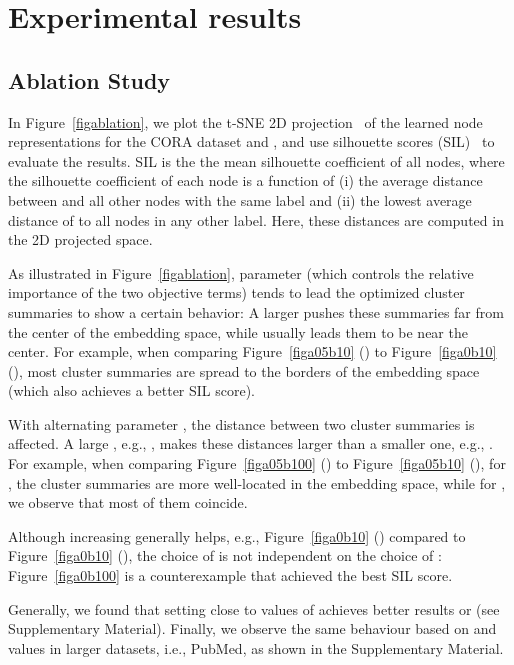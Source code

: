 \documentclass{article}
\begin{document}
\section{Experimental results}

\subsection{Ablation Study} \label{secintra}
In Figure~\ref{figablation}, we plot the t-SNE 2D projection~\cite{maaten2008visualizing} of the learned node representations for the CORA dataset and , and use silhouette scores (SIL)~\cite{rousseeuw1987silhouettes} to evaluate the results. SIL is the the mean silhouette coefficient of all nodes, where the silhouette coefficient of each node  is a function of (i) the average distance between  and all other nodes with the same label and (ii) the lowest average distance of  to all nodes in any other label. Here, these distances are computed in the 2D projected space.

As illustrated in Figure~\ref{figablation}, parameter  (which controls the relative importance of the two objective terms) tends to lead the optimized cluster summaries to show a certain behavior: A larger  pushes these summaries far from the center of the embedding space, while  usually leads them to be near the center. For example, when comparing Figure~\ref{figa05b10} () to Figure~\ref{figa0b10} (), most cluster summaries are spread to the borders of the embedding space (which also achieves a better SIL score).

With alternating parameter , the distance between two cluster summaries is affected.  A large , e.g., , makes these distances larger than a smaller one, e.g., . For example, when comparing Figure~\ref{figa05b100} () to Figure~\ref{figa05b10} (), for , the cluster summaries are more well-located in the embedding space, while for , we observe that most of them coincide. 

Although increasing  generally helps, e.g., Figure~\ref{figa0b10} () compared to Figure~\ref{figa0b10} (), the choice of  is not independent on the choice of : Figure~\ref{figa0b100} is a counterexample that  achieved the best SIL score. 

Generally, we found that setting  close to values of  achieves better results  or  (see Supplementary Material). Finally, we observe the same behaviour based on  and  values in larger datasets, i.e., PubMed, as shown in the Supplementary Material.
\end{document}
